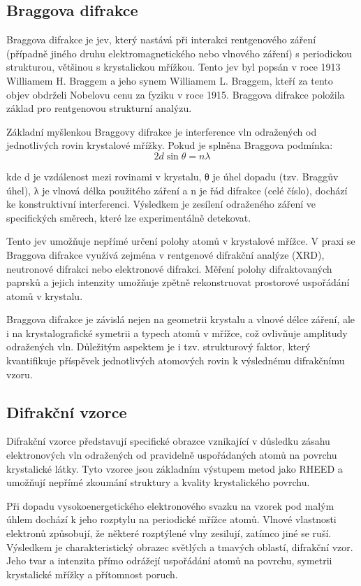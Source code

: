 \documentclass[a4paper,11pt]{article}
\begin{document}
\subsection{Braggova difrakce}
    Braggova difrakce je jev, který nastává při interakci rentgenového záření (případně jiného druhu elektromagnetického nebo vlnového záření) s periodickou strukturou, většinou s krystalickou mřížkou. Tento jev byl popsán v roce 1913 Williamem H. Braggem a jeho synem Williamem L. Braggem, kteří za tento objev obdrželi Nobelovu cenu za fyziku v roce 1915. Braggova difrakce  položila základ pro rentgenovou strukturní analýzu.

Základní myšlenkou Braggovy difrakce je interference vln odražených od jednotlivých rovin krystalové mřížky. Pokud je splněna Braggova podmínka:
\[
2d \sin\theta = n\lambda
\]

kde d je vzdálenost mezi rovinami v krystalu, θ je úhel dopadu (tzv. Braggův úhel), λ je vlnová délka použitého záření a n je řád difrakce (celé číslo), dochází ke konstruktivní interferenci. Výsledkem je zesílení odraženého záření ve specifických směrech, které lze experimentálně detekovat.

Tento jev umožňuje nepřímé určení polohy atomů v krystalové mřížce. V praxi se Braggova difrakce využívá zejména v rentgenové difrakční analýze (XRD), neutronové difrakci nebo elektronové difrakci. Měření polohy difraktovaných paprsků a jejich intenzity umožňuje zpětně rekonstruovat prostorové uspořádání atomů v krystalu.

Braggova difrakce je závislá nejen na geometrii krystalu a vlnové délce záření, ale i na krystalografické symetrii a typech atomů v mřížce, což ovlivňuje amplitudy odražených vln. Důležitým aspektem je i tzv. strukturový faktor, který kvantifikuje příspěvek jednotlivých atomových rovin k výslednému difrakčnímu vzoru.\cite{Bragg}
\newpage


\subsection{Difrakční vzorce}
Difrakční vzorce představují specifické obrazce vznikající v důsledku zásahu elektronových vln odražených od pravidelně uspořádaných atomů na povrchu krystalické látky. Tyto vzorce jsou základním výstupem metod jako RHEED a umožňují nepřímé zkoumání struktury a kvality krystalického povrchu.

Při dopadu vysokoenergetického elektronového svazku na vzorek pod malým úhlem dochází k jeho rozptylu na periodické mřížce atomů. Vlnové vlastnosti elektronů způsobují, že některé rozptýlené vlny zesilují, zatímco jiné se ruší. Výsledkem je charakteristický obrazec světlých a tmavých oblastí, difrakční vzor. Jeho tvar a intenzita přímo odrážejí uspořádání atomů na povrchu, symetrii krystalické mřížky a přítomnost poruch.
\end{document}
